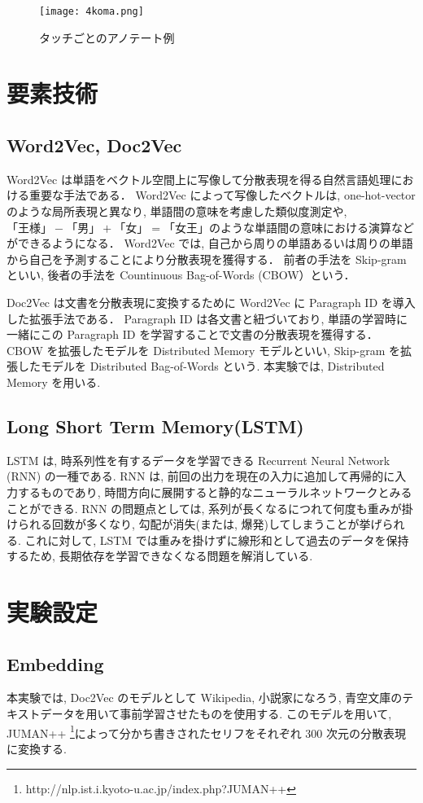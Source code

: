 \documentclass[twocolumn]{jarticle}     %
\begin{document}
\begin{figure}[t]
  \centering
  \texttt{[image: 4koma.png]}
  \caption{タッチごとのアノテート例}
  \label{fig:4koma}
\end{figure}

\section{要素技術}
\subsection{Word2Vec, Doc2Vec}
Word2Vec \cite{word2vec} は単語をベクトル空間上に写像して分散表現を得る自然言語処理における重要な手法である．
Word2Vec によって写像したベクトルは, one-hot-vector のような局所表現と異なり, 単語間の意味を考慮した類似度測定や, $「王様」-「男」+「女」=「女王」$のような単語間の意味における演算などができるようになる．
Word2Vec では, 自己から周りの単語あるいは周りの単語から自己を予測することにより分散表現を獲得する．
前者の手法を Skip-gram といい, 後者の手法を Countinuous Bag-of-Words (CBOW）という．

Doc2Vec \cite{word2vec}は文書を分散表現に変換するために Word2Vec に Paragraph ID を導入した拡張手法である．
Paragraph ID は各文書と紐づいており, 単語の学習時に一緒にこの Paragraph ID を学習することで文書の分散表現を獲得する．
CBOW を拡張したモデルを Distributed Memory モデルといい, Skip-gram を拡張したモデルを Distributed Bag-of-Words という. 本実験では, Distributed Memory を用いる.

\subsection{Long Short Term Memory(LSTM)}
LSTM は, 時系列性を有するデータを学習できる Recurrent Neural Network (RNN) の一種である.
RNN は, 前回の出力を現在の入力に追加して再帰的に入力するものであり, 時間方向に展開すると静的なニューラルネットワークとみることができる. RNN の問題点としては, 系列が長くなるにつれて何度も重みが掛けられる回数が多くなり, 勾配が消失(または, 爆発)してしまうことが挙げられる. これに対して, LSTM では重みを掛けずに線形和として過去のデータを保持するため, 長期依存を学習できなくなる問題を解消している.

\section{実験設定}
\subsection{Embedding}
本実験では, Doc2Vec のモデルとして Wikipedia, 小説家になろう, 青空文庫のテキストデータを用いて事前学習させたものを使用する.
このモデルを用いて, JUMAN++ \footnote{http://nlp.ist.i.kyoto-u.ac.jp/index.php?JUMAN++}によって分かち書きされたセリフをそれぞれ 300 次元の分散表現に変換する.
\end{document}
